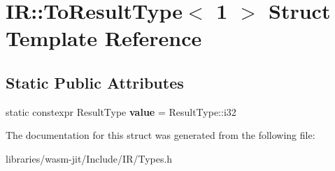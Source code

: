 \hypertarget{struct_i_r_1_1_to_result_type_3_011_01_4}{}\section{IR\+:\+:To\+Result\+Type$<$ 1 $>$ Struct Template Reference}
\label{struct_i_r_1_1_to_result_type_3_011_01_4}
\subsection*{Static Public Attributes}
\begin{DoxyCompactItemize}
\item 
\mbox{\label{struct_i_r_1_1_to_result_type_3_011_01_4_a721ada2e0cff3619237891c7cb228bcf}} 
static constexpr Result\+Type {\bfseries value} = Result\+Type\+::i32
\end{DoxyCompactItemize}


The documentation for this struct was generated from the following file\+:\begin{DoxyCompactItemize}
\item 
libraries/wasm-\/jit/\+Include/\+I\+R/Types.\+h\end{DoxyCompactItemize}
